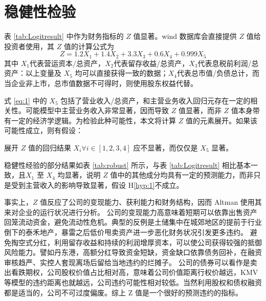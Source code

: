 \chapter{稳健性检验}
表 \ref{tab:Logitresult} 中作为财务指标的 \(Z\) 值显著。wind 数据库会直接提供 \(Z\) 值给投资者使用，其 \(Z\) 值的计算公式为
\begin{equation}
	\label{eq:1}
	Z=1.2X_1+1.4X_2+3.3X_3+0.6X_4+0.999X_5
\end{equation}
其中 \(X_1\)代表营运资本/总资产，\(X_2\)代表留存收益/总资产，\(X_3\)代表息税前利润/总资产：以上变量及 \(X_5\) 均可以直接获得一致的数据；\(X_4\)代表总市值/负债总计，而当企业非上市，总市值数据不可得时，则使用股东权益代替。

式 \ref{eq:1} 中的 \(X_{5}\) 包括了营业收入/总资产，和主营业务收入回归元存在一定的相关性。可能模型中主营业务收入非常显著，因而导致 \(Z\) 值显著，而非 \(Z\) 值本身带有一定的经济学逻辑。为检验此种可能性，本文将计算 \(Z\) 值的元素展开。如果该可能性成立，则有假设：

\begin{hyp}
	\label{hyp:1}
	展开 \(Z\) 值的回归结果 \(X_i\forall i\in [1,2,3,4] \) 应不显著，而仅仅是 \(X_5\) 显著。
\end{hyp}



稳健性经验的部分结果如表
\ref{tab:robust}
所示，与表 \ref{tab:Logitresult} 相比基本一致，且\(X_1\) 至 \(X_4\) 均显著，说明 \(Z\) 值中的其他成分均具有一定的预测能力，而非只是受到主营收入的影响导致显著，假设 H\ref{hyp:1}不成立。

事实上，\(Z\) 值反应了公司的变现能力、获利能力和财务结构，因而 Altman 使用其来对企业的运行状况进行分析。
公司的变现能力高意味着短期可以依靠出售资产回笼流动资金，避免流动性危机。典型的反例是土储集中在城郊地区的提前于行业倒下的泰禾地产，暴雷之后低价甩卖资产进一步恶化财务状况引发更多违约。
避免掏空式分红，利用留存收益和持续的利润增厚资本，可以使公司获得较强的抵御风险能力。譬如丹东港，高额分红导致资金短缺，资金缺口依靠债务回补，在融资审核趋严、实控人套现离场后留给当地违约的烂摊子。
公司的债券可以看作是卖出看跌期权，公司股权价值占比相对高，意味着公司价值距离行权价越远，KMV 等模型的违约距离也就越远，公司违约可能性相对较低。当然利用股权和债权融资都是适当的，公司不可过度偏废。综上 Z 值是一个很好的预测违约的指标。
